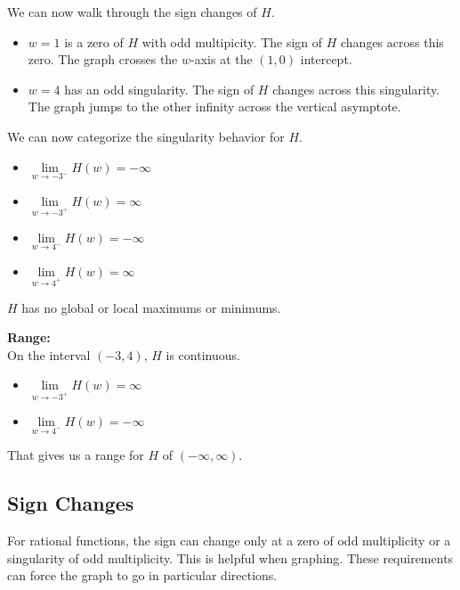 \documentclass{ximera}
\begin{document}
\begin{example}
We can now walk through the sign changes of $H$.

\begin{itemize}
\item $w = 1$ is a zero of $H$ with odd multipicity.  The sign of $H$ changes across this zero. The graph crosses the $w$-axis at the $(1, 0)$ intercept.
\item $w = 4$ has an odd singularity. The sign of $H$ changes across this singularity.  The graph jumps to the other infinity across the vertical asymptote.
\end{itemize}



We can now categorize the singularity behavior for $H$.

\begin{itemize}
\item $\lim\limits_{w \to -3^-} H(w) = -\infty$
\item $\lim\limits_{w \to -3^+} H(w) = \infty$
\item $\lim\limits_{w \to 4^-} H(w) = -\infty$
\item $\lim\limits_{w \to 4^+} H(w) = \infty$
\end{itemize}

$H$ has no global or local maximums or minimums.





\textbf{Range:} \\


On the interval $(-3, 4)$, $H$ is continuous.

\begin{itemize}
\item $\lim\limits_{w \to -3^+} H(w) = \infty$
\item $\lim\limits_{w \to 4^-} H(w) = -\infty$
\end{itemize}

That gives us a range for $H$ of $(-\infty, \infty )$.

\end{example}







\subsection*{Sign Changes}

For rational functions, the sign can change only at a zero of odd multiplicity or a singularity of odd multiplicity. This is helpful when graphing. These requirements can force the graph to go in particular directions.
\end{document}
